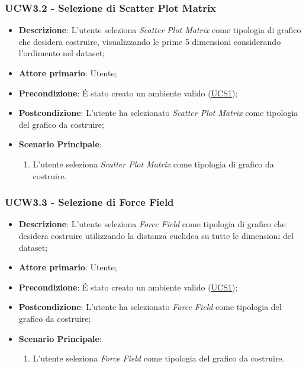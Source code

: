 \subsubsection{UCW3.2 - Selezione di Scatter Plot Matrix}
\label{ssub:ucw3.2}
\begin{itemize}

	\item \textbf{Descrizione}: L’utente seleziona \emph{Scatter Plot Matrix} come tipologia di grafico che desidera
	      costruire, visualizzando le prime 5 dimensioni considerando l'ordimento nel dataset;

	\item \textbf{Attore primario}: Utente;

	\item \textbf{Precondizione}:   É stato creato un ambiente valido (\hyperref[sub:ucs1]{UCS1});

	\item \textbf{Postcondizione}:  L'utente ha selezionato \emph{Scatter Plot Matrix} come tipologia del grafico da
	      costruire;

	\item \textbf{Scenario Principale}:
	      \begin{enumerate}
		      \item L'utente seleziona \emph{Scatter Plot Matrix} come tipologia di grafico da costruire.
	      \end{enumerate}
\end{itemize}


\subsubsection{UCW3.3 - Selezione di Force Field}
\label{ssub:ucw3.3}
\begin{itemize}

	\item \textbf{Descrizione}: L’utente seleziona \emph{Force Field} come tipologia di grafico che desidera
	      costruire utilizzando la distanza euclidea su tutte le dimensioni del dataset;

	\item \textbf{Attore primario}: Utente;

	\item \textbf{Precondizione}:   É stato creato un ambiente valido (\hyperref[sub:ucs1]{UCS1});

	\item \textbf{Postcondizione}:  L'utente ha selezionato \emph{Force Field} come tipologia del grafico da
	      costruire;

	\item \textbf{Scenario Principale}:
	      \begin{enumerate}
		      \item L'utente seleziona \emph{Force Field} come tipologia del grafico da costruire.
	      \end{enumerate}

\end{itemize}


